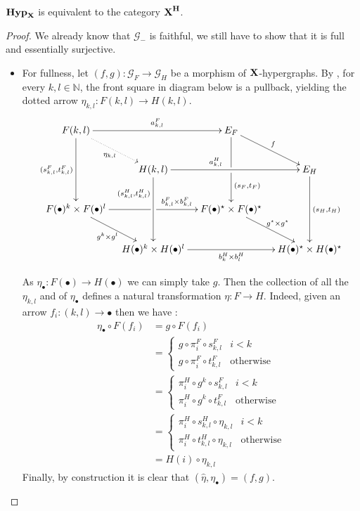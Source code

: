 \documentclass[runningheads,envcountsect]{llncs}
\def\X{\textbf {\textup{X}}}
\newcommand{\catname}[1]{\textbf{\textup{#1}}}
\newcommand{\hyp}{\catname{Hyp}}
\begin{document}
\begin{proposition}
	$\hyp_\X$ is equivalent to the category $\catname{\X}^{\catname{H}}$.
\end{proposition}
\begin{proof}	
We already know that $\mathcal{G}_{-}$ is faithful, we still have to show that it is full and essentially surjective.
	\begin{itemize}
		\item For fullness, let $(f,g)\colon \mathcal{G}_F\to \mathcal{G}_{H}$ be a morphism of $\X$-hypergraphs. By , for every $k,l\in \mathbb{N}$, the front square in diagram below is a pullback, yielding the dotted arrow $\eta_{k,l}\colon F(k,l)\to H(k,l)$.
		\[\xymatrix@C=10pt{F(k,l)   \ar[dd]_{(s^F_{k,l}, t^F_{k,l})}\ar[rr]^-{a^F_{k,l}} \ar@{.>}[dr]_{\eta_{k,l }}&& E_F \ar[dd]|\hole^(.7){(s_F, t_F)}  \ar[dr]^{f}\\ & H(k,l) \ar[dd]_(.3){(s^H_{k,l}, t^H_{k,l})}\ar[rr]^(.4){a^H_{k,l}} &&  E_H \ar[dd]^{(s_H, t_H)}\\F(\bullet)^k\times F(\bullet)^l \ar[dr]_{g^k\times g^l} \ar[rr]|\hole^(.65){b^F_{k,l}\times b^F_{k,l}}& &F(\bullet)^\star \times F(\bullet)^\star  \ar[dr]^{g^\star\times g^\star}\\&H(\bullet)^k\times H(\bullet)^l \ar[rr]_{b^H_k\times b^H_l} && H(\bullet)^\star \times H(\bullet)^\star  }\]
		
		As $\eta_{\bullet}\colon F(\bullet)\to H(\bullet)$ we can simply take  $g$.  Then  the collection of all the $\eta_{k,l}$ and of $\eta_\bullet$ defines a natural transformation $\eta\colon F\to H$. Indeed, given an arrow $f_i\colon(k,l)\to \bullet$ then we have :	
		\begin{align*}
			\eta_\bullet \circ F(f_i)&=g\circ F(f_i)
			\\&= \begin{cases}
			g\circ \pi^F_i\circ s^F_{k,l} & i <k\\
			g\circ \pi^F_i\circ t^F_{k,l} & \text{otherwise}
			\end{cases}
			\\&=
			\begin{cases}
		\pi^H_i\circ g^k\circ s^F_{k,l} & i <k\\
		\pi^H_i\circ g^k\circ t^F_{k,l} 	& \text{otherwise}
			\end{cases}\\&=
		\begin{cases}
	\pi^H_i\circ s^H_{k,l} \circ \eta_{k,l}& i <k\\
	\pi^H_i\circ t^H_{k,l} \circ \eta_{k,l}	& \text{otherwise}
	\end{cases}\\&=H(i)\circ \eta_{k,l}
		\end{align*}
		Finally, by construction it is clear that $(\hat{\eta}, \eta_{\bullet})=(f,g)$. 
		

\end{itemize}
\end{proof}
\end{document}
